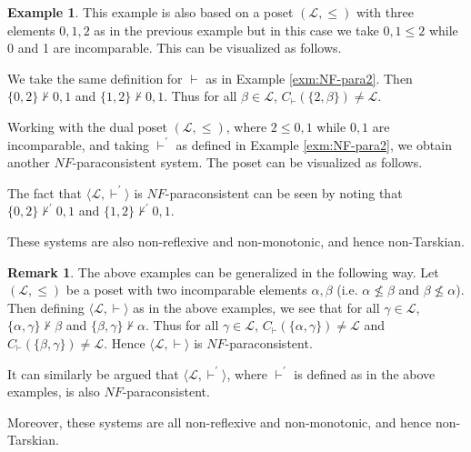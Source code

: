 \documentclass[submission]{eptcs}
\newcommand{\lang}{\mathcal{L}}
\theoremstyle{definition}
\newtheorem{rem}[thm]{Remark}
\newtheorem{exa}[thm]{Example}
\begin{document}
\begin{exa}
This example is also based on a poset $(\lang,\le)$ with three elements $0,1,2$ as in the previous example but in this case we take $0,1\le2$ while 0 and 1 are incomparable. 
This can be visualized as follows.
\begin{center}
\end{center}
We take the same definition for $\vdash$ as in Example \ref{exm:NF-para2}. Then $\{0,2\}\not\vdash0,1$ and $\{1,2\}\not\vdash0,1$. Thus for all $\beta\in\lang$, $C_\vdash(\{2,\beta\})\neq\lang$.

Working with the dual poset $(\lang,\le)$, where $2\le 0,1$ while $0,1$ are incomparable, and taking $\vdash^\prime$ as defined in Example \ref{exm:NF-para2}, we obtain another $NF$-paraconsistent system. The poset can be visualized as follows.
\begin{center}
\end{center}
The fact that $\langle\lang,\vdash^\prime\rangle$ is $NF$-paraconsistent can be seen by noting that $\{0,2\}\not\vdash^\prime0,1$ and $\{1,2\}\not\vdash^\prime0,1$.

These systems are also non-reflexive and  non-monotonic, and hence non-Tarskian.
\end{exa}

\begin{rem}\label{rem:NF-para3}
The above examples can be generalized in the following way. Let $(\lang,\le)$ be a poset with two incomparable elements $\alpha,\beta$ (i.e. $\alpha\not\le\beta$ and $\beta\not\le\alpha$). Then defining $\langle\lang,\vdash\rangle$ as in the above examples, we see that for all $\gamma\in\lang$, $\{\alpha,\gamma\}\not\vdash\beta$ and $\{\beta,\gamma\}\not\vdash\alpha$. Thus for all $\gamma\in\lang$, $C_\vdash(\{\alpha,\gamma\})\neq\lang$ and $C_\vdash(\{\beta,\gamma\})\neq\lang$. Hence $\langle\lang,\vdash\rangle$ is $NF$-paraconsistent.

It can similarly be argued that $\langle\lang,\vdash^\prime\rangle$, where $\vdash^\prime$ is defined as in the above examples, is also $NF$-paraconsistent.

Moreover, these systems are all non-reflexive and  non-monotonic, and hence non-Tarskian.
\end{rem}
\end{document}
